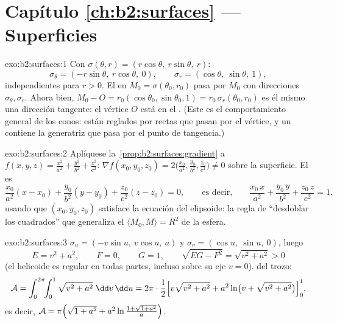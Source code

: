 \section*{Capítulo \ref{ch:b2:surfaces} --- Superficies}

\begin{solution}{exo:b2:surfaces:1}
Con $\sigma(\theta, r) = (r\cos\theta,\ r\sin\theta,\ r)$:
\[
\sigma_\theta = (-r\sin\theta,\ r\cos\theta,\ 0),
\qquad
\sigma_r = (\cos\theta,\ \sin\theta,\ 1),
\]
independientes para $r > 0$. El  en $M_0 =
\sigma(\theta_0, r_0)$ pasa por $M_0$ con direcciones $\sigma_\theta,
\sigma_r$. Ahora bien, $M_0 - O = r_0(\cos\theta_0, \sin\theta_0, 1)
= r_0\,\sigma_r(\theta_0, r_0)$ es él mismo una dirección tangente:
el vértice $O$ está en el . (Este es el comportamiento
general de los conos: están reglados por rectas que pasan por el
vértice, y un  contiene la generatriz que pasa por el
punto de tangencia.)
\end{solution}

\begin{solution}{exo:b2:surfaces:2}
Aplíquese la~\cref{prop:b2:surfaces:gradient} a $f(x,y,z) =
\frac{x^2}{a^2} + \frac{y^2}{b^2} + \frac{z^2}{c^2}$: $\nabla
f(x_0,y_0,z_0) = 2\bigl(\frac{x_0}{a^2}, \frac{y_0}{b^2},
\frac{z_0}{c^2}\bigr) \neq 0$ sobre la superficie. El
 es
\[
\frac{x_0}{a^2}(x - x_0) + \frac{y_0}{b^2}(y - y_0)
+ \frac{z_0}{c^2}(z - z_0) = 0,
\qquad\text{es decir,}\qquad
\frac{x_0\,x}{a^2} + \frac{y_0\,y}{b^2} + \frac{z_0\,z}{c^2} = 1,
\]
usando que $(x_0, y_0, z_0)$ satisface la ecuación del elipsoide: la
regla de ``desdoblar los cuadrados'' que generaliza el $\langle M_0,
M \rangle = R^2$ de la esfera.
\end{solution}

\begin{solution}{exo:b2:surfaces:3}
$\sigma_u = (-v\sin u,\ v\cos u,\ a)$ y $\sigma_v = (\cos u,\ \sin
u,\ 0)$, luego
\[
E = v^2 + a^2, \qquad F = 0, \qquad G = 1,
\qquad
\sqrt{EG - F^2} = \sqrt{v^2 + a^2} > 0
\]
(el helicoide es regular en todas partes, incluso sobre su eje $v =
0$).  del trozo:
\[
\mathcal{A} = \int_0^{2\pi}\!\!\int_0^1
\sqrt{v^2 + a^2}\;\dd v\,\dd u
= 2\pi\cdot\frac12\Bigl[v\sqrt{v^2 + a^2}
+ a^2\ln\bigl(v + \sqrt{v^2 + a^2}\bigr)\Bigr]_0^1 ,
\]
es decir, $\mathcal{A} = \pi\Bigl(\sqrt{1 + a^2} + a^2\ln\frac{1 +
\sqrt{1 + a^2}}{a}\Bigr)$.
\end{solution}

